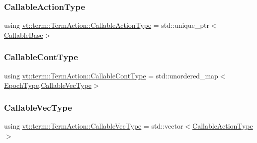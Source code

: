 \subsubsection{\texorpdfstring{Callable\+Action\+Type}{CallableActionType}}
{\footnotesize\ttfamily using \hyperlink{structvt_1_1term_1_1_term_action_aa4a32326730b20530526e1db6512c017}{vt\+::term\+::\+Term\+Action\+::\+Callable\+Action\+Type} =  std\+::unique\+\_\+ptr$<$\hyperlink{structvt_1_1term_1_1_callable_base}{Callable\+Base}$>$}

\mbox{\label{structvt_1_1term_1_1_term_action_a802aaa899ce87dc9f8a53d43b202044c}} 
\subsubsection{\texorpdfstring{Callable\+Cont\+Type}{CallableContType}}
{\footnotesize\ttfamily using \hyperlink{structvt_1_1term_1_1_term_action_a802aaa899ce87dc9f8a53d43b202044c}{vt\+::term\+::\+Term\+Action\+::\+Callable\+Cont\+Type} =  std\+::unordered\+\_\+map$<$\hyperlink{namespacevt_a81d11b28122d43bf9834577e4a06440f}{Epoch\+Type},\hyperlink{structvt_1_1term_1_1_term_action_ad9e499fefd57d3bea8e0cae68a6b7f61}{Callable\+Vec\+Type}$>$}

\mbox{\label{structvt_1_1term_1_1_term_action_ad9e499fefd57d3bea8e0cae68a6b7f61}} 
\subsubsection{\texorpdfstring{Callable\+Vec\+Type}{CallableVecType}}
{\footnotesize\ttfamily using \hyperlink{structvt_1_1term_1_1_term_action_ad9e499fefd57d3bea8e0cae68a6b7f61}{vt\+::term\+::\+Term\+Action\+::\+Callable\+Vec\+Type} =  std\+::vector$<$\hyperlink{structvt_1_1term_1_1_term_action_aa4a32326730b20530526e1db6512c017}{Callable\+Action\+Type}$>$}

\mbox{\label{structvt_1_1term_1_1_term_action_acefe3cb1e2a2bcf0d530082f53a2bada}} 
